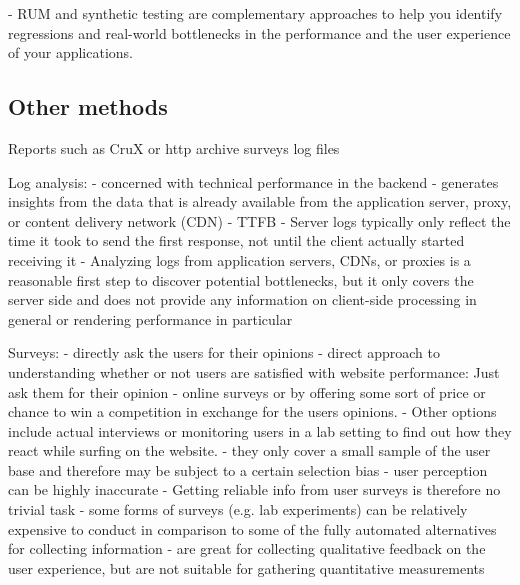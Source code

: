 





- RUM and synthetic testing are complementary approaches to help you identify regressions and real-world bottlenecks in the performance and the user experience of your applications.










\subsection{Other methods}

Reports such as CruX or http archive
surveys
log files




Log analysis:
- concerned with technical performance in the backend
- generates insights from the data that is already available from the application server, proxy, or content delivery network (CDN)
- TTFB
- Server logs typically only reflect the time it took to send the first response, not until the client actually started receiving it
- Analyzing logs from application servers, CDNs, or proxies is a reasonable first step to discover potential bottlenecks, but it only covers the server side and does not provide any information on client-side processing in general or rendering performance in particular


Surveys:
- directly ask the users for their opinions
- direct approach to understanding whether or not users are satisfied with website performance: Just ask them for their opinion
- online surveys or by offering some sort of price or chance to win a competition in exchange for the users opinions. 
- Other options include actual interviews or monitoring users in a lab setting to find out how they react while surfing on the website.
- they only cover a small sample of the user base and therefore may be subject to a certain selection bias
- user perception can be highly inaccurate
- Getting reliable info from user surveys is therefore no trivial task
- some forms of surveys (e.g. lab experiments) can be relatively expensive to conduct in comparison to some of the fully automated alternatives for collecting information
- are great for collecting qualitative feedback on the user experience, but are not suitable for gathering quantitative measurements







